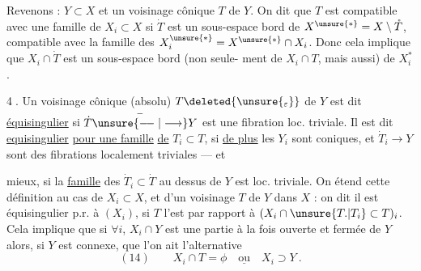 Revenons : $Y\subset X$ et un voisinage
cônique  $T$ de $Y$. On dit que $T$ est
 compatible avec une famille de $X_i\subset X$
si 
$\dot T$ est un sous-espace bord de
$X^{\unsure{*}}=X\setminus\mathring T$, compatible avec la famille des
$X_i^{\unsure{*}}=X^{\unsure{*}}\cap X_i$. Donc cela implique que
$X_i\cap\dot T$ est un sous-espace bord (non seule-
ment de $X_i\cap T$, mais aussi) de $X_i^*$.

\textcircled{4}.  Un voisinage cônique (absolu)
$T\deleted{\unsure{_\varepsilon}}$ de
$Y$ est dit \uline{équisingulier} si $\dot T\overset{-}{\unsure{\relbar\joinrel\relbar|\longrightarrow}}Y$ est une
fibration loc. triviale. Il est dit \uline{equisingulier}
\uline{pour une famille} \uline{de} $T_i\subset T$, si \uline{de plus}
les $Y_i$ sont coniques, et $\dot T_i\longrightarrow Y$ sont des
fibrations localement triviales --- et 

mieux, si la \uline{famille} des $\dot T_i\subset\dot T$ au dessus
de $Y$ est  loc. triviale. On étend cette
définition au cas de $X_i\subset X$, et d'un
voisinage  $T$ de $Y$ dans $X$ : on dit
il est équisingulier p.r. à $(X_i)$, si $T$
l'est par rapport à $(X_i\cap\unsure{T.|T_i}\subset T)_i$. Cela
implique que si $\forall i$, $X_i\cap Y$ est une
partie à la fois ouverte et fermée de $Y$
alors, si $Y$ est connexe, que  l'on ait
l'alternative
\[
(14)\qquad X_i\cap T=\phi\quad\underline{\text{ou}}\quad X_i\supset Y\ .
\]
\margin{Si $T$ équisingulier p.r. à $(X_i)$,
$\lambda T$ l'est strictement pour $\lambda\in]0,1[$.}

